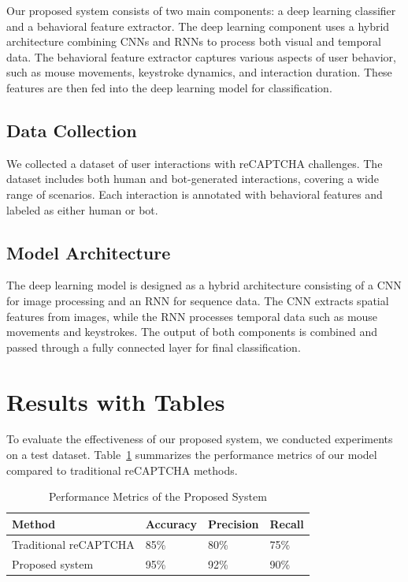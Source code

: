 \documentclass{article}
\begin{document}
Our proposed system consists of two main components: a deep learning classifier and a behavioral feature extractor. The deep learning component uses a hybrid architecture combining CNNs and RNNs to process both visual and temporal data. The behavioral feature extractor captures various aspects of user behavior, such as mouse movements, keystroke dynamics, and interaction duration. These features are then fed into the deep learning model for classification.

\subsection{Data Collection}
We collected a dataset of user interactions with reCAPTCHA challenges. The dataset includes both human and bot-generated interactions, covering a wide range of scenarios. Each interaction is annotated with behavioral features and labeled as either human or bot.

\subsection{Model Architecture}
The deep learning model is designed as a hybrid architecture consisting of a CNN for image processing and an RNN for sequence data. The CNN extracts spatial features from images, while the RNN processes temporal data such as mouse movements and keystrokes. The output of both components is combined and passed through a fully connected layer for final classification.

\section{Results with Tables}
\label{sec:results}

To evaluate the effectiveness of our proposed system, we conducted experiments on a test dataset. Table~\ref{tab:results} summarizes the performance metrics of our model compared to traditional reCAPTCHA methods.

\begin{table}[ht]
\centering
\caption{Performance Metrics of the Proposed System}
\label{tab:results}
\begin{tabular}{@{}llll@{}}
\toprule
Method & Accuracy & Precision & Recall \\ \midrule
Traditional reCAPTCHA & 85\% & 80\% & 75\% \\
Proposed system & 95\% & 92\% & 90\% \\ \bottomrule
\end{tabular}
\end{table}
\end{document}
